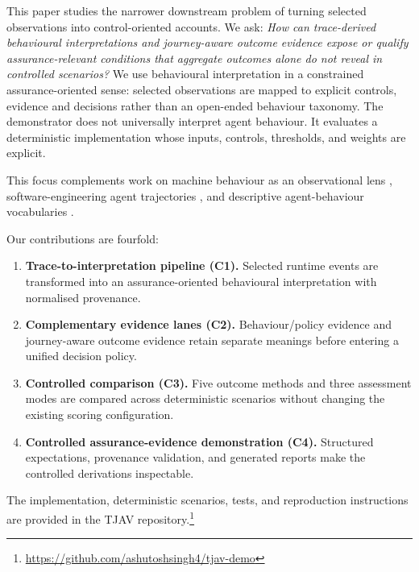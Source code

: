 \documentclass{article}
\begin{document}
This paper studies the narrower downstream problem of turning selected observations into control-oriented accounts. We ask: \emph{How can trace-derived behavioural interpretations and journey-aware outcome evidence expose or qualify assurance-relevant conditions that aggregate outcomes alone do not reveal in controlled scenarios?} We use behavioural interpretation in a constrained assurance-oriented sense: selected observations are mapped to explicit controls, evidence and decisions rather than an open-ended behaviour taxonomy. The demonstrator does not universally interpret agent behaviour. It evaluates a deterministic implementation whose inputs, controls, thresholds, and weights are explicit.

This focus complements work on machine behaviour as an observational lens \cite{rahwan2019machinebehaviour}, software-engineering agent trajectories \cite{yang2024sweagent}, and descriptive agent-behaviour vocabularies \cite{gao2026interpretagent}.

Our contributions are fourfold:
\begin{enumerate}
\item \textbf{Trace-to-interpretation pipeline (C1).} Selected runtime events are transformed into an assurance-oriented behavioural interpretation with normalised provenance.
\item \textbf{Complementary evidence lanes (C2).} Behaviour/policy evidence and journey-aware outcome evidence retain separate meanings before entering a unified decision policy.
\item \textbf{Controlled comparison (C3).} Five outcome methods and three assessment modes are compared across deterministic scenarios without changing the existing scoring configuration.
\item \textbf{Controlled assurance-evidence demonstration (C4).} Structured expectations, provenance validation, and generated reports make the controlled derivations inspectable.
\end{enumerate}

The implementation, deterministic scenarios, tests, and reproduction
instructions are provided in the TJAV repository.\footnote{%
\url{https://github.com/ashutoshsingh4/tjav-demo}}
\end{document}
